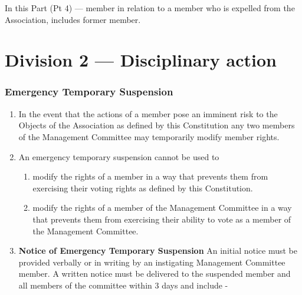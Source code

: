 In this Part (Pt 4) --- member in relation to a member who is expelled from the Association, includes former member.

\hypertarget{division-2-disciplinary-action}{%
\part*{Division 2 --- Disciplinary action}\label{division-2-disciplinary-action}}

\hypertarget{emergency-temporary-suspension}{%
\section{Emergency Temporary Suspension}\label{emergency-temporary-suspension}}

\begin{enumerate}

\item In the event that the actions of a member pose an imminent risk to the Objects of the Association as defined by this Constitution any two members of the Management Committee may temporarily modify member rights.
\item An emergency temporary suspension cannot be used to

  \begin{enumerate}
  
  \item modify the rights of a member in a way that prevents them from exercising their voting rights as defined by this Constitution.
  \item modify the rights of a member of the Management Committee in a way that prevents them from exercising their ability to vote as a member of the Management Committee.
  \end{enumerate}
\item \textbf{Notice of Emergency Temporary Suspension} An initial notice must be provided verbally or in writing by an instigating Management Committee member. A written notice must be delivered to the suspended member and all members of the committee within 3 days and include -

  \begin{enumerate}
  

\end{enumerate}
\end{enumerate}
